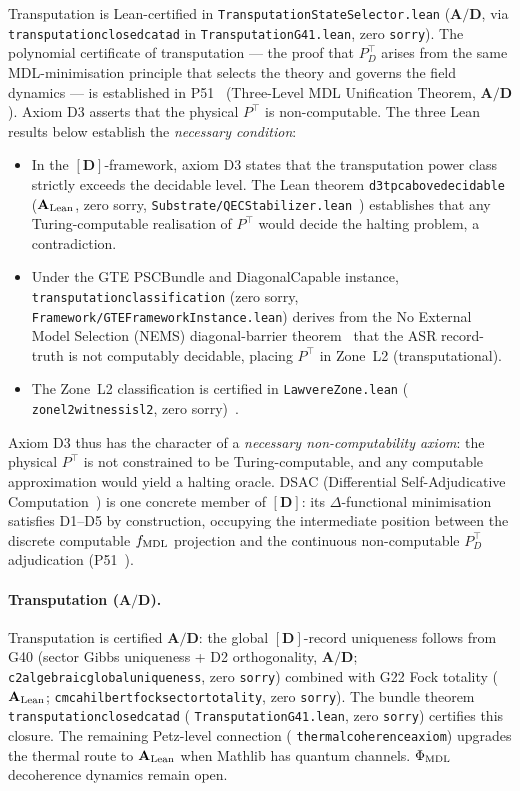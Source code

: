 \documentclass[11pt]{article}
\theoremstyle{remark}
\newcommand{\lean}[1]{%
  \penalty-100
  \begingroup\def\_{\textunderscore\allowbreak}\texttt{#1}\endgroup}
\newcommand{\fmdl}{f_{\rm MDL}}
\newcommand{\CatAL}{\ensuremath{\textbf{A}_{\rm Lean}}}
\newcommand{\CatAD}{\textbf{A/D}}
\begin{document}
Transputation is Lean-certified in \lean{TransputationStateSelector.lean}
($\CatAD$, via \lean{transputation\_closed\_catad} in
\lean{TransputationG41.lean}, zero \texttt{sorry}).
The polynomial certificate of transputation --- the proof that $P^\top_D$ arises
from the same MDL-minimisation principle that selects the theory and governs the
field dynamics --- is established in
P51~\cite{SpivackPolynomialTransputation} (Three-Level MDL Unification Theorem,
$\CatAD$).
Axiom D3 asserts that the physical $P^\top$ is non-computable.
The three Lean results below establish the \emph{necessary condition}:
\begin{itemize}[noitemsep]
\item In the $[\mathbf{D}]$-framework, axiom D3 states that the transputation power
      class strictly exceeds the decidable level.  The Lean theorem
      \lean{d3\_tpc\_above\_decidable} ($\CatAL$, zero sorry,
      \lean{Substrate/QECStabilizer.lean}~\cite{SpivackGTEMobius}) establishes
      that any Turing-computable realisation of $P^\top$ would decide the halting
      problem, a contradiction.
\item Under the GTE PSCBundle and DiagonalCapable instance,
      \lean{transputation\_classification} (zero sorry,
      \lean{Framework/GTEFrameworkInstance.lean}) derives from the No External Model Selection (NEMS)
      diagonal-barrier theorem~\cite{SpivackBHUnitarity} that the ASR record-truth is
      not computably decidable, placing $P^\top$ in Zone~L2 (transputational).
\item The Zone~L2 classification is certified in \lean{LawvereZone.lean}
      (\lean{zone\_l2\_witness\_is\_l2}, zero sorry)~\cite{SpivackGTEMobius}.
\end{itemize}
Axiom D3 thus has the character of a \emph{necessary non-computability axiom}:
the physical $P^\top$ is not constrained to be Turing-computable, and any
computable approximation would yield a halting oracle.
DSAC (Differential Self-Adjudicative Computation~\cite{SpivackNEMS77}) is one
concrete member of $[\mathbf{D}]$: its $\Delta$-functional minimisation satisfies
D1--D5 by construction, occupying the intermediate position between the discrete
computable $\fmdl$ projection and the continuous non-computable
$P^\top_D$ adjudication (P51~\cite{SpivackPolynomialTransputation}).

\paragraph{Transputation ($\CatAD$).}
Transputation is certified $\CatAD$: the global $[\mathbf{D}]$-record
uniqueness follows from G40 (sector Gibbs uniqueness + D2 orthogonality,
$\CatAD$; \lean{c2\_algebraic\_global\_uniqueness}, zero \texttt{sorry}) combined
with G22 Fock totality ($\CatAL$;
\lean{cmca\_hilbert\_fock\_sector\_totality}, zero \texttt{sorry}).
The bundle theorem \lean{transputation\_closed\_catad}
(\lean{TransputationG41.lean}, zero \texttt{sorry}) certifies this closure.
The remaining Petz-level connection (\lean{thermal\_coherence\_axiom}) upgrades
the thermal route to $\CatAL$ when Mathlib has quantum channels.
$\Phi_{\rm MDL}$ decoherence dynamics remain open.
\end{document}
